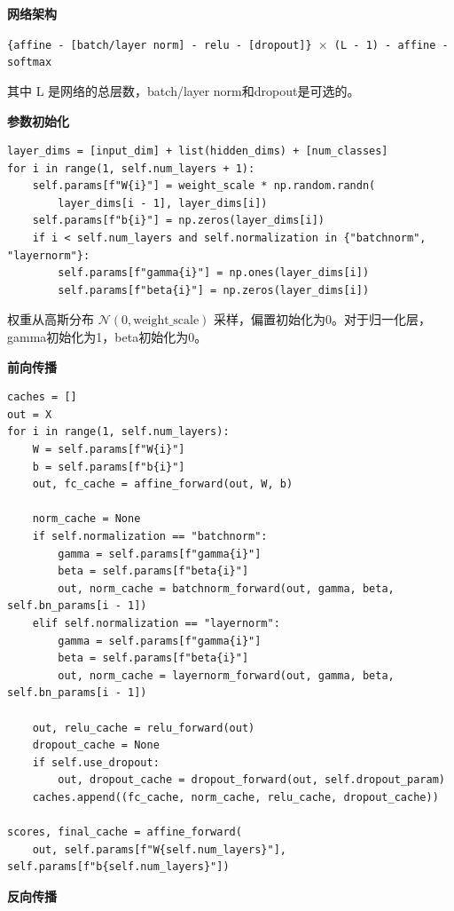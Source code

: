 \textbf{网络架构}

\begin{center}
\texttt{\{affine - [batch/layer norm] - relu - [dropout]\} $\times$ (L - 1) - affine - softmax}
\end{center}

其中 L 是网络的总层数，batch/layer norm和dropout是可选的。

\textbf{参数初始化}

\begin{lstlisting}[style=cleanpython]
layer_dims = [input_dim] + list(hidden_dims) + [num_classes]
for i in range(1, self.num_layers + 1):
    self.params[f"W{i}"] = weight_scale * np.random.randn(
        layer_dims[i - 1], layer_dims[i])
    self.params[f"b{i}"] = np.zeros(layer_dims[i])
    if i < self.num_layers and self.normalization in {"batchnorm", "layernorm"}:
        self.params[f"gamma{i}"] = np.ones(layer_dims[i])
        self.params[f"beta{i}"] = np.zeros(layer_dims[i])
\end{lstlisting}

权重从高斯分布 $\mathcal{N}(0, \text{weight\_scale})$ 采样，偏置初始化为0。对于归一化层，gamma初始化为1，beta初始化为0。

\textbf{前向传播}

\begin{lstlisting}[style=cleanpython]
caches = []
out = X
for i in range(1, self.num_layers):
    W = self.params[f"W{i}"]
    b = self.params[f"b{i}"]
    out, fc_cache = affine_forward(out, W, b)

    norm_cache = None
    if self.normalization == "batchnorm":
        gamma = self.params[f"gamma{i}"]
        beta = self.params[f"beta{i}"]
        out, norm_cache = batchnorm_forward(out, gamma, beta, self.bn_params[i - 1])
    elif self.normalization == "layernorm":
        gamma = self.params[f"gamma{i}"]
        beta = self.params[f"beta{i}"]
        out, norm_cache = layernorm_forward(out, gamma, beta, self.bn_params[i - 1])

    out, relu_cache = relu_forward(out)
    dropout_cache = None
    if self.use_dropout:
        out, dropout_cache = dropout_forward(out, self.dropout_param)
    caches.append((fc_cache, norm_cache, relu_cache, dropout_cache))

scores, final_cache = affine_forward(
    out, self.params[f"W{self.num_layers}"], self.params[f"b{self.num_layers}"])
\end{lstlisting}

\textbf{反向传播}

